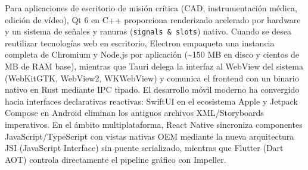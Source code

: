 \documentclass{book}
\begin{document}
Para aplicaciones de escritorio de misión crítica (CAD, instrumentación médica, edición de vídeo), Qt 6 en C++ proporciona renderizado acelerado por hardware y un sistema de señales y ranuras (\texttt{signals \& slots}) nativo. Cuando se desea reutilizar tecnologías web en escritorio, Electron empaqueta una instancia completa de Chromium y Node.js por aplicación (\textasciitilde{}150 MB en disco y cientos de MB de RAM base), mientras que Tauri delega la interfaz al WebView del sistema (WebKitGTK, WebView2, WKWebView) y comunica el frontend con un binario nativo en Rust mediante IPC tipado.
El desarrollo móvil moderno ha convergido hacia interfaces declarativas reactivas: SwiftUI en el ecosistema Apple y Jetpack Compose en Android eliminan los antiguos archivos XML/Storyboards imperativos. En el ámbito multiplataforma, React Native sincroniza componentes JavaScript/TypeScript con vistas nativas OEM mediante la nueva arquitectura JSI (JavaScript Interface) sin puente serializado, mientras que Flutter (Dart AOT) controla directamente el pipeline gráfico con Impeller.
\end{document}
